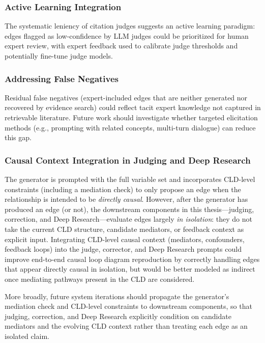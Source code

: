 \subsubsection{Active Learning Integration}

The systematic leniency of citation judges suggests an active learning paradigm: edges flagged as low-confidence by LLM judges could be prioritized for human expert review, with expert feedback used to calibrate judge thresholds and potentially fine-tune judge models.

\subsubsection{Addressing False Negatives}

Residual false negatives (expert-included edges that are neither generated nor recovered by evidence search) could reflect tacit expert knowledge not captured in retrievable literature. Future work should investigate whether targeted elicitation methods (e.g., prompting with related concepts, multi-turn dialogue) can reduce this gap.

\subsubsection{Causal Context Integration in Judging and Deep Research}

The generator is prompted with the full variable set and incorporates CLD-level constraints (including a mediation check) to only propose an edge when the relationship is intended to be \textit{directly causal}. However, after the generator has produced an edge (or not), the downstream components in this thesis---judging, correction, and Deep Research---evaluate edges largely \textit{in isolation}: they do not take the current CLD structure, candidate mediators, or feedback context as explicit input. Integrating CLD-level causal context (mediators, confounders, feedback loops) into the judge, corrector, and Deep Research prompts could improve end-to-end causal loop diagram reproduction by correctly handling edges that appear directly causal in isolation, but would be better modeled as indirect once mediating pathways present in the CLD are considered.

More broadly, future system iterations should propagate the generator's mediation check and CLD-level constraints to downstream components, so that judging, correction, and Deep Research explicitly condition on candidate mediators and the evolving CLD context rather than treating each edge as an isolated claim.
